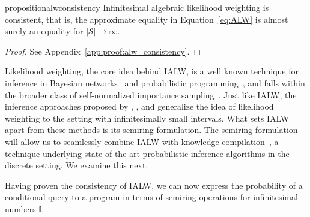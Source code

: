 \begin{restatable}{proposition}{alwconsistency}
\label{prop:alw_consistency}
Infinitesimal algebraic likelihood weighting is consistent, that is, the approximate equality in Equation~\ref{eq:ALW} is almost surely an equality for $\lvert \mathcal{S} \rvert \rightarrow \infty$.
\end{restatable}
\begin{proof}
    See Appendix~\ref{app:proof:alw_consistency}.
\end{proof}



Likelihood weighting, the core idea behind IALW, is a well known technique for inference in Bayesian networks~\citep{fung1990weighing} and probabilistic programming~\citep{milch2005approximate,nitti2016probabilistic}, and falls within the broader class of self-normalized importance sampling~\citep{kahn1950random,kloek1978bayesian,casella1998post}.
Just like IALW, the inference approaches proposed by \citet{nitti2016probabilistic}, \citet{wu2018discrete}, and \citet{jacobs2021paradoxes}  generalize the idea of likelihood weighting to the setting with infinitesimally small intervals. What sets IALW apart from these methods is its semiring formulation. The semiring formulation will allow us to seamlessly combine IALW with knowledge compilation~\citep{darwiche2002knowledge}, a technique underlying state-of-the art probabilistic inference algorithms in the discrete setting. We examine this next.









Having proven the consistency of IALW, we can now express the probability of a conditional query to a \dcproblogsty program in terms of semiring operations for infinitesimal numbers $\mathbb{I}$.


